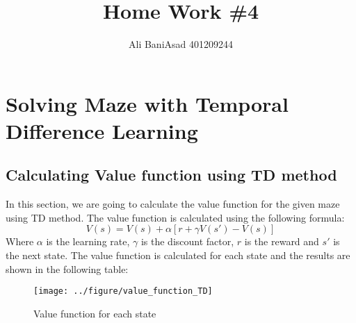 \documentclass{article}
\title{Home Work \#4}
\author{Ali BaniAsad 401209244}
\begin{document}
	\maketitle
	\section{Solving Maze with Temporal Difference Learning}
	\subsection{Calculating Value function using TD method}
	In this section, we are going to calculate the value function for the given maze using TD method. The value function is calculated using the following formula:
	\begin{equation}
		V(s) = V(s) + \alpha [r + \gamma V(s') - V(s)]
	\end{equation}
	Where $\alpha$ is the learning rate, $\gamma$ is the discount factor, $r$ is the reward and $s'$ is the next state. The value function is calculated for each state and the results are shown in the following table:
	\begin{figure}[H]
		\centering
		\texttt{[image: ../figure/value\_function\_TD]}
		\caption{Value function for each state}
		\label{fig:tdvaluefunction}
	\end{figure}
\end{document}
